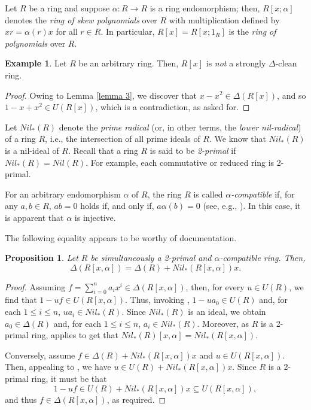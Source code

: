 \documentclass[12pt]{amsart}
\newtheorem{proposition}[theorem]{Proposition}
\theoremstyle{definition}
\newtheorem{example}[theorem]{Example}
\begin{document}
Let $R$ be a ring and suppose $\alpha : R \to R$ is a ring endomorphism; then, $R[x; \alpha]$ denotes the {\it ring of skew polynomials} over $R$ with multiplication defined by $xr = \alpha(r)x$ for all $r \in R$. In particular, $R[x] = R[x; 1_R]$ is the {\it ring of polynomials} over $R$.

\begin{example} \label{example 1}
Let \( R \) be an arbitrary ring. Then, \( R[x] \) is {\it not} a strongly $\Delta$-clean ring.
\end{example}

\begin{proof}
Owing to Lemma \ref{lemma 3}, we discover that \( x - x^2 \in \Delta(R[x]) \), and so \( 1 - x + x^2 \in U(R[x]) \), which is a contradiction, as asked for.
\end{proof}

Let $Nil_{*}(R)$ denote the {\it prime radical} (or, in other terms, the {\it lower nil-radical}) of a ring $R$, i.e., the intersection of all prime ideals of $R$. We know that $Nil_{*}(R)$ is a nil-ideal of $R$. Recall that a ring $R$ is said to be {\it 2-primal} if $Nil_{*}(R) = Nil(R)$. For example, each commutative or reduced ring is 2-primal.

\medskip

For an arbitrary endomorphism \( \alpha \) of \( R \), the ring \( R \) is called {\it \(\alpha\)-compatible} if, for any \( a, b \in R \), \( ab = 0 \) holds if, and only if, \( a\alpha(b) = 0 \) (see, e.g., \cite{ann}). In this case, it is apparent that \( \alpha \) is injective.

\medskip

The following equality appears to be worthy of documentation.

\begin{proposition} \label{pro 1}
Let \( R \) be simultaneously a 2-primal and \(\alpha\)-compatible ring. Then, \[\Delta(R[x, \alpha]) = \Delta(R) + Nil_{*}(R[x, \alpha])x.\]
\end{proposition}

\begin{proof}
Assuming \( f = \sum_{i=0}^{n} a_i x^i \in \Delta(R[x, \alpha]) \), then, for every \( u \in U(R) \), we find that \( 1 - uf \in U(R[x, \alpha]) \). Thus, invoking \cite[Corollary 2.14]{cheni}, \( 1 - ua_0 \in U(R) \) and, for each \( 1 \le  i \le  n \), \( ua_i \in Nil_{*}(R) \). Since \( Nil_{*}(R) \) is an ideal, we obtain \( a_0 \in \Delta(R) \) and, for each \( 1 \le  i \le  n \), \( a_i \in Nil_{*}(R) \). Moreover, as \( R \) is a 2-primal ring, \cite[Lemma 2.2]{cheni} applies to get that \( Nil_{*}(R)[x,\alpha] = Nil_{*}(R[x, \alpha]) \).

Conversely, assume \( f \in \Delta(R) + Nil_{*}(R[x, \alpha])x \) and \( u \in U(R[x,\alpha]) \). Then, appealing to \cite[Corollary 2.14]{cheni}, we have \( u \in U(R) + Nil_{*}(R[x, \alpha])x \). Since \( R \) is a 2-primal ring, it must be that \[ 1 - uf \in U(R) + Nil_{*}(R[x, \alpha])x \subseteq U(R[x, \alpha]) ,\] and thus \( f \in \Delta(R[x, \alpha]) \), as required.
\end{proof}
\end{document}
